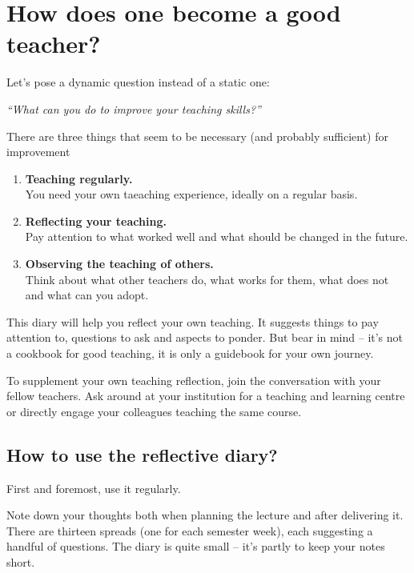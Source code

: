 
\chapter*{How does one become a good teacher?}

\vspace*{1em}
Let's pose a dynamic question instead of a static one:

\vspace*{1em}
\textit{\large \enquote{What can you do to improve your teaching skills?}}

\vspace*{1em}
There are three things that seem to be necessary (and probably sufficient) for improvement\footnotemark
{}
\begin{enumerate}
\item \textbf{Teaching regularly.}\\You need your own taeaching experience, ideally on a regular basis.\item \textbf{Reflecting your teaching.}\\Pay attention to what worked well and what should be changed in the future.
\item \textbf{Observing the teaching of others.}\\Think about what other teachers do, what works for them, what does not and what can you adopt.
\end{enumerate}

This diary will help you reflect your own teaching. It suggests things to pay attention to, questions to ask and aspects to ponder. But bear in mind -- it's not a cookbook for good teaching, it is only a guidebook for your own journey.

To supplement your own teaching reflection, join the conversation with your fellow teachers. Ask around at your institution for a teaching and learning centre or directly engage your colleagues teaching the same course.

\newpage
\section*{How to use the reflective diary?}

First and foremost, use it regularly.

Note down your thoughts both when planning the lecture and after delivering it. There are thirteen spreads (one for each semester week), each suggesting a handful of questions. The diary is quite small -- it's partly to keep your notes short.

